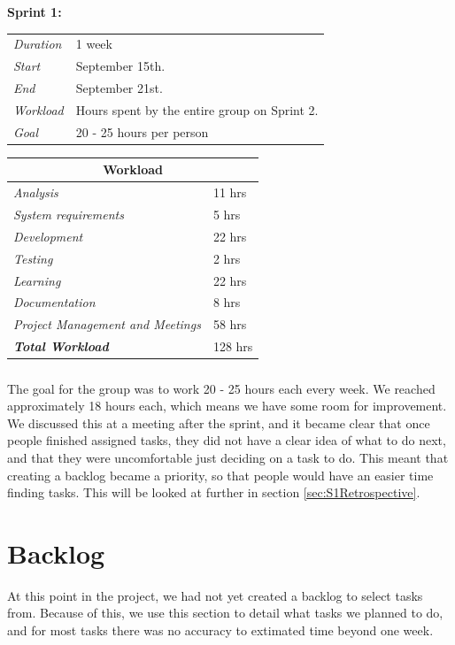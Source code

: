 \begin{minipage}{\linewidth}
\centering
\setlength{\tabcolsep}{22pt}
\textbf{Sprint 1:} 
\smallskip
{}
\begin{tabular}{ |l l| }
	\hline
	\it{Duration} & 1 week \\
	\it{Start} & September 15th. \\
	\it{End} & September 21st. \\
	\it{Workload} & Hours spent by the entire group on Sprint 2. \\
	\it{Goal} & 20 - 25 hours per person \\
	\hline
\end{tabular}
\end{minipage}
%
\bigskip
%
\begin{minipage}{\linewidth}
\setlength{\tabcolsep}{25pt}
\centering
{}
\begin{tabular}{ |l|l| }
	\hline
	\multicolumn{2}{|c|}{\cellcolor{gray!25} Workload} \\
	\hline
	\it{Analysis} & 11 hrs\\
	\it{System requirements} & 5 hrs\\
	\it{Development} & 22 hrs\\
	\it{Testing} & 2 hrs\\
	\it{Learning} & 22 hrs\\
	\it{Documentation} & 8 hrs\\
	\it{Project Management and Meetings} & 58 hrs\\
	\hline
	\textbf{\textit{Total Workload}} & 128 hrs\\
	\hline
\end{tabular}
\end{minipage}

\bigskip

\subparagraph{} 
The goal for the group was to work 20 - 25 hours each every week. We reached approximately 18 hours each, which means we have some room for improvement. We discussed this at a meeting after the sprint, and it became clear that once people finished assigned tasks, they did not have a clear idea of what to do next, and that they were uncomfortable just deciding on a task to do. This meant that creating a backlog became a priority, so that people would have an easier time finding tasks. This will be looked at further in section \ref{sec:S1Retrospective}.

\section{Backlog}
\label{sec:S1Backlog}
At this point in the project, we had not yet created a backlog to select tasks from. Because of this, we use this section to detail what tasks we planned to do, and for most tasks there was no accuracy to extimated time beyond one week. \\

